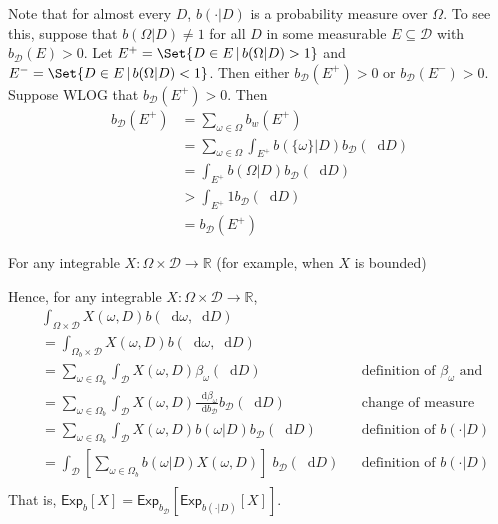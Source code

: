 \documentclass[a4paper]{article}
\newcommand\Exp{\mathsf{Exp}}
\newcommand{\D}{\mathcal{D}}
\newcommand{\Decs}{\mathcal{D}}
\renewcommand{\Re}{\mathbb{R}}
\renewcommand{\color}[1]{}
\newenvironment{colored}[1]{\leavevmode\color{#1}}{}
\newcommand\SetDelimiter[1][]{
	\nonscript\,#1\vert \allowbreak \nonscript\,\mathopen{}}
\providecommand\given{\SetDelimiter}
\newcommand*\diff{\mathop{}\!\mathrm{d}}
\newenvironment{CCM rewritten}
{\begingroup\color{blue}} %
{\endgroup}              %
\begin{document}
\begin{colored}{violet}
\begin{colored}{red}
Note that for almost every $D$, $b(\cdot |D)$ is a probability measure over $\Omega$. To see this, suppose that $b(\Omega | D)\not=1$ for all $D$ in some measurable $E\subseteq\Decs$ with $b_\D(E)>0$. Let $E^+=\Set{D\in E\given b(\Omega | D)>1}$ and $E^-=\Set{D\in E\given b(\Omega | D)<1}$. Then either $b_\D(E^+)>0$ or $b_\D(E^-)>0$. Suppose WLOG that $b_\D(E^+)>0$. Then
\begin{align}
	b_\D(E^+)&=\sum_{\omega\in\Omega} b_w(E^+)\\
	&=\sum_{\omega\in\Omega}\int_{E^+}b(\{\omega\} |D) b_\D(\diff D)\\
	&=\int_{E^+}b(\Omega |D) b_\D(\diff D)\\
	&>\int_{E^+} 1 b_\D(\diff D)\\
	&=b_\D(E^+)
\end{align}





For any integrable $X: \Omega\times \Decs\to\Re$ (for example, when $X$ is bounded)



	Hence, for any integrable $X:\Omega\times\Decs\to\Re$, 
\begin{align}
	&\int_{\Omega\times \Decs} X(\omega,D) b(\diff \omega, \diff D)\\
	&=\int_{\Omega_b\times \Decs} X(\omega,D) b(\diff \omega, \diff D)\\
	&=\sum_{\omega\in\Omega_b} \int_\Decs X(\omega,D)\beta_\omega(\diff D)&&\text{definition of $\beta_\omega$ and}\\
	&=\sum_{\omega\in\Omega_b} \int_\Decs X(\omega,D)\frac{\diff \beta_\omega}{\diff b_\Decs}b_\Decs(\diff D)&&\text{change of measure}\\
	&=\sum_{\omega\in\Omega_b} \int_\Decs X(\omega,D)b(\omega|D)b_\Decs(\diff D)&&\text{definition of $b(\cdot|D)$}\\
	&=\int_\Decs \left[\sum_{\omega\in\Omega_b} b(\omega|D)X(\omega,D)\right]\;b_\Decs(\diff D)&&\text{definition of $b(\cdot|D)$}\\
\end{align}
That is, $\Exp_b[X]=\Exp_{b_\Decs}[\Exp_{b(\cdot|D)}[X]]$.



\end{colored}
\end{colored}
\end{document}
